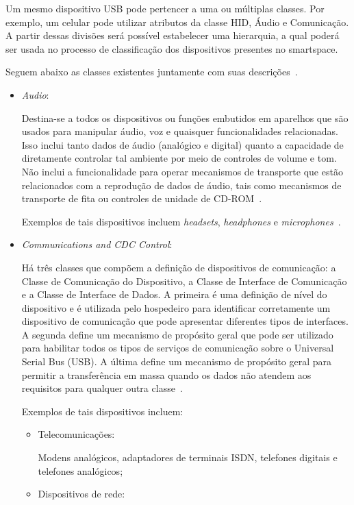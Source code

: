 Um mesmo dispositivo USB pode pertencer a uma ou múltiplas classes. Por exemplo, um celular pode utilizar atributos da classe HID, Áudio e Comunicação. A partir dessas divisões será possível estabelecer uma hierarquia, a qual poderá ser usada no processo de classificação dos dispositivos presentes no smartspace.

Seguem abaixo as classes existentes juntamente com suas descrições~\cite{usbclasscodes}.

\begin{itemize}
	\item \emph{Audio}: 

	Destina-se a todos os dispositivos ou funções embutidos em aparelhos que são usados para manipular áudio, voz e quaisquer funcionalidades relacionadas. Isso inclui tanto dados de áudio (analógico e digital) quanto a capacidade de diretamente controlar tal ambiente por meio de controles de volume e tom. Não inclui a funcionalidade para operar mecanismos de transporte que estão relacionados com a reprodução de dados de áudio, tais como mecanismos de transporte de fita ou controles de unidade de CD-ROM~\cite{usbaudioclass}.

	Exemplos de tais dispositivos incluem \emph{headsets}, \emph{headphones} e \emph{microphones}~\cite{usbbasicaudioclass}.
	\item \emph{Communications and CDC Control}: 

	Há três classes que compõem a definição de dispositivos de comunicação: a Classe de Comunicação do Dispositivo, a Classe de Interface de Comunicação e a Classe de Interface de Dados. A primeira é uma definição de nível do dispositivo e é utilizada pelo hospedeiro para identificar corretamente um dispositivo de comunicação que pode apresentar diferentes tipos de interfaces. A segunda define um mecanismo de propósito geral que pode ser utilizado para habilitar todos os tipos de serviços de comunicação sobre o Universal Serial Bus (USB). A última define um mecanismo de propósito geral para permitir a transferência em massa quando os dados não atendem aos requisitos para qualquer outra classe~\cite{usbcommunicationclass}.

	Exemplos de tais dispositivos incluem:
	\begin{itemize}
		\item Telecomunicações: 

		Modens analógicos, adaptadores de terminais ISDN, telefones digitais e telefones analógicos;
		\item Dispositivos de rede: 


\end{itemize}
\end{itemize}
